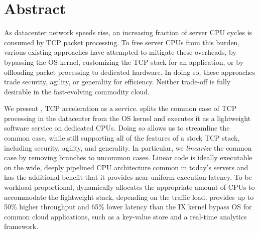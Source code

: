 \section*{Abstract}

As datacenter network speeds rise, an increasing fraction of server
CPU cycles is consumed by TCP packet processing. To free server CPUs
from this burden, various existing approaches have attempted to
mitigate these overheads, by bypassing the OS kernel, customizing the
TCP stack for an application, or by offloading packet processing to
dedicated hardware. In doing so, these approaches trade security,
agility, or generality for efficiency. Neither trade-off is fully
desirable in the fast-evolving commodity cloud.

We present \softtcp, TCP acceleration as a service. \taas splits the
common case of TCP processing in the datacenter from the OS kernel and
executes it as a lightweight software service on dedicated CPUs. Doing
so allows us to streamline the common case, while still supporting all
of the features of a stock TCP stack, including security, agility, and
generality. In particular, we \emph{linearize} the common case by
removing branches to uncommon cases. Linear code is ideally executable
on the wide, deeply pipelined CPU architecture common in today’s
servers and has the additional benefit that it provides near-uniform
execution latency. To be workload proportional, \taas dynamically
allocates the appropriate amount of CPUs to accommodate the
lightweight stack, depending on the traffic load. \taas provides up to
50\% higher throughput and 65\% lower latency than the IX kernel
bypass OS for common cloud applications, such as a key-value store and
a real-time analytics framework.
